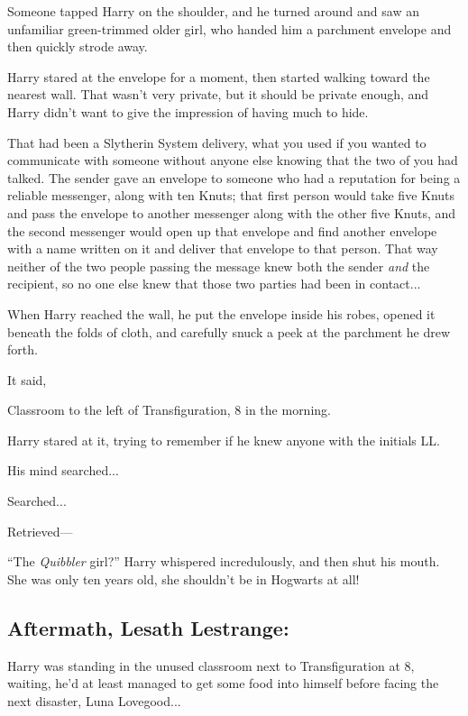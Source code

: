 Someone tapped Harry on the shoulder, and he turned around and saw an unfamiliar green-trimmed older girl, who handed him a parchment envelope and then quickly strode away.

Harry stared at the envelope for a moment, then started walking toward the nearest wall. That wasn’t very private, but it should be private enough, and Harry didn’t want to give the impression of having much to hide.

That had been a Slytherin System delivery, what you used if you wanted to communicate with someone without anyone else knowing that the two of you had talked. The sender gave an envelope to someone who had a reputation for being a reliable messenger, along with ten Knuts; that first person would take five Knuts and pass the envelope to another messenger along with the other five Knuts, and the second messenger would open up that envelope and find another envelope with a name written on it and deliver that envelope to that person. That way neither of the two people passing the message knew both the sender \emph{and} the recipient, so no one else knew that those two parties had been in contact...

When Harry reached the wall, he put the envelope inside his robes, opened it beneath the folds of cloth, and carefully snuck a peek at the parchment he drew forth.

It said,

\begin{writtenNote}
Classroom to the left of Transfiguration, 8 in the morning.

\end{writtenNote}

Harry stared at it, trying to remember if he knew anyone with the initials LL.

His mind searched...

Searched...

Retrieved—

“The \emph{Quibbler} girl?” Harry whispered incredulously, and then shut his mouth. She was only ten years old, she shouldn’t be in Hogwarts at all!
\replacement{\sbreak}{}

\subsection{Aftermath, Lesath Lestrange:}

\noindent{}Harry was standing in the unused classroom next to Transfiguration at 8\AM, waiting, he’d at least managed to get some food into himself before facing the next disaster, Luna Lovegood...

